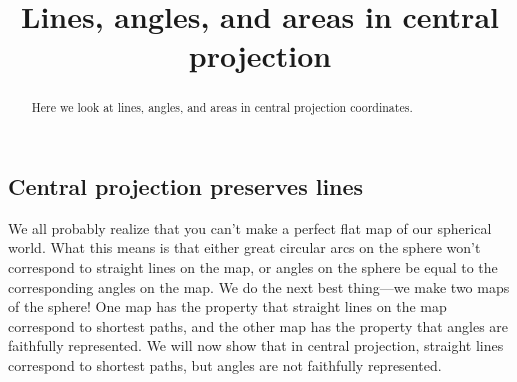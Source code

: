 \documentclass[newpage,hints,12pt,noauthor,handout,nooutcomes]{ximera}
\title{Lines, angles, and areas in central projection}
\begin{document}
\begin{abstract}
  Here we look at lines, angles, and areas in central projection coordinates. 
\end{abstract}
\maketitle

\subsection{Central projection preserves lines}

We all probably realize that you can't make a perfect flat map of our
spherical world.  What this means is that either great circular arcs
on the sphere won't correspond to straight lines on the map, or angles
on the sphere be equal to the corresponding angles on the map.  We do
the next best thing---we make two maps of the sphere!  One map has the
property that straight lines on the map correspond to shortest paths,
and the other map has the property that angles are faithfully
represented. We will now show that in central projection, straight
lines correspond to shortest paths, but angles are not faithfully
represented.
\end{document}
